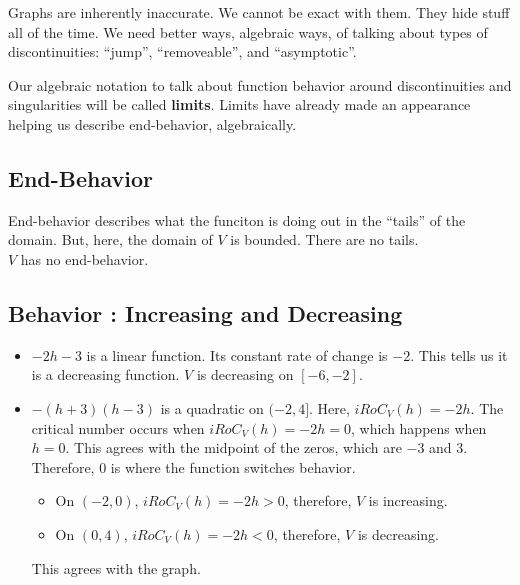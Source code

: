 \documentclass{ximera}
\begin{document}
\begin{notation}


Graphs are inherently inaccurate.  We cannot be exact with them.  They hide stuff all of the time. We need better ways, algebraic ways, of talking about types of discontinuities: ``jump'', ``removeable'', and ``asymptotic''.

Our algebraic notation to talk about function behavior around discontinuities and singularities will be called \textbf{\textcolor{purple!85!blue}{limits}}.  Limits have already made an appearance helping us describe end-behavior, algebraically.
\end{notation}










\subsection*{End-Behavior} 


End-behavior describes what the funciton is doing out in the ``tails'' of the domain.  But, here, the domain of $V$ is bounded.  There are no tails. \\

$V$ has no end-behavior. \\









\subsection*{Behavior : Increasing and Decreasing} 



\begin{itemize}
\item \textbf{$-2h-3$} is a linear function.  Its constant rate of change is $-2$.  This tells us it is a decreasing function.  $V$ is decreasing on $[-6, -2]$.

\item \textbf{$-(h+3)(h-3)$} is a quadratic on $(-2, 4]$. Here, $iRoC_V(h) = -2h$. The critical number occurs when $iRoC_V(h) = -2h = 0$, which happens when $h=0$. This agrees with the midpoint of the zeros, which are $-3$ and $3$.  Therefore, $0$ is where the function switches behavior.  

\begin{itemize}
\item On $(-2, 0)$, $iRoC_V(h) = -2h > 0$, therefore, $V$ is increasing.  
\item On $(0,4)$, $iRoC_V(h) = -2h < 0$, therefore, $V$ is decreasing.
\end{itemize}

This agrees with the graph.

\end{itemize}
\end{document}
